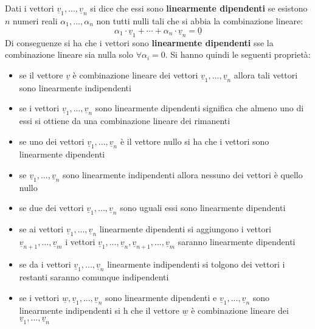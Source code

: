 \documentclass[a4paper,12pt, oneside]{book}
\begin{document}
\begin{definizione}
	Dati i vettori $\underline{v}_1,...,\underline{v}_n$ si dice che essi sono \textbf{linearmente dipendenti} se esistono $n$ numeri reali $\alpha_1,...,\alpha_n$ non tutti nulli tali che si abbia la combinazione lineare:
	$$\alpha_1\cdot \underline{v}_1+\cdots+\alpha_n\cdot \underline{v}_n=\underline{0}$$
	Di conseguenze si ha che i vettori sono \textbf{linearmente dipendenti} sse la combinazione lineare sia nulla solo $\forall \alpha_i=0$.\newpage
	Si hanno quindi le seguenti proprietà:
	\begin{itemize}
		\item se il vettore $\underline{v}$ è combinazione lineare dei vettori $\underline{v}_1,...,\underline{v}_n$  allora tali vettori sono linearmente indipendenti
		\item se i vettori $\underline{v}_1,...,\underline{v}_n$  sono linearmente dipendenti significa che almeno uno di essi si ottiene da una combinazione lineare dei rimanenti
		\item se uno dei vettori $\underline{v}_1,...,\underline{v}_n$  è il vettore nullo si ha che i vettori sono linearmente dipendenti
		\item se $\underline{v}_1,...,\underline{v}_n$  sono linearmente indipendenti allora nessuno dei vettori è quello nullo
		\item se due dei vettori $\underline{v}_1,...,\underline{v}_n$  sono uguali essi sono linearmente dipendenti
		\item se ai vettori $\underline{v}_1,...,\underline{v}_n$ linearmente dipendenti si aggiungono i vettori $\underline{v}_{n+1},...,\underline{v}_m$ i vettori $\underline{v}_1,...,\underline{v}_n,\underline{v}_{n+1},...,\underline{v}_m$  saranno linearmente dipendenti
		\item se da i vettori $\underline{v}_1,...,\underline{v}_n$  linearmente indipendenti si tolgono dei vettori i restanti saranno comunque indipendenti
		\item se i vettori $\underline{w},\underline{v}_1,...,\underline{v}_n$ sono linearmente dipendenti e $\underline{v}_1,...,\underline{v}_n$ sono linearmente indipendenti si h che il vettore $\underline{w}$ è combinazione lineare dei $\underline{v}_1,...,\underline{v}_n$
	\end{itemize}
\end{definizione}
\end{document}
